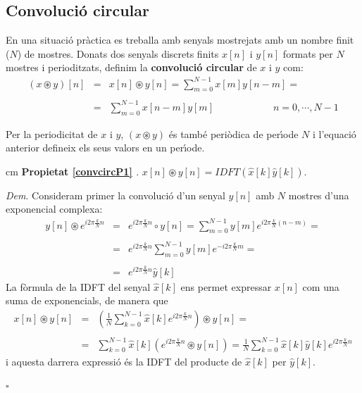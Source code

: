 \documentclass{article}
\begin{document}
\subsection{Convoluci\'o circular}
En una situaci\'o pr\`actica es treballa amb senyals mostrejats amb un nombre finit 
($N$) de mostres. Donats dos senyals discrets finits $x[n]$ i $y[n]$ formats 
per $N$ mostres i perioditzats, definim la {\bf convoluci\'o circular} de $x$ i $y$
com:
\begin{equation}
\begin{array}{rcl}
(x \circledast y)[n] & = & x[n] \circledast y[n]=\sum_{m=0}^{N-1} x[m] y[n-m]=\\\\
 & = & \sum_{m=0}^{N-1} x[n-m]y[m] \qquad \qquad \qquad  n=0, \cdots,N-1
\end{array}
\end{equation}
 
Per la periodicitat de $x$ i $y$, $(x \circledast y)$ \'es tamb\'e peri\`odica de 
per\'\i ode $N$ i l'equaci\'o anterior defineix els seus valors en un per\'\i ode.
 
 cm
\noindent
{\bf Propietat \ref{convcircP1} \label{convcircP1}}. 
$x[n] \circledast y[n] = IDFT ( \hat{x}[k] \hat{y}[k] )$.

\noindent
{\it Dem}. Consideram primer la convoluci\'o d'un senyal $y[n]$ amb 
$N$ mostres d'una exponencial complexa:
\[
\begin{array}{rcl}
y[n] \circledast e^{i 2 \pi \frac{k}{N} n} & = & e^{i 2 \pi \frac{k}{N} n} \circ y[n] =
\sum_{m=0}^{N-1} y[m] e^{i 2 \pi \frac{k}{N} (n-m)} =\\\\
 & = & e^{i 2 \pi \frac{k}{N} n} \sum_{m=0}^{N-1} y[m] e^{-i 2 \pi \frac{k}{N} m}=\\\\
 & = & e^{i 2 \pi \frac{k}{N} n} \hat{y}[k]
\end{array}
\]
\noindent 
La f\`ormula de la IDFT del senyal $\hat{x}[k]$ ens permet expressar $x[n]$ com una
suma de exponencials, de manera que
\[
\begin{array}{rcl}
x[n] \circledast y[n] & = & 
(\frac{1}{N} \sum_{k=0}^{N-1} \hat{x}[k] e^{i 2 \pi \frac{k}{N} n}) \circledast y[n] =\\\\
 & = & \sum_{k=0}^{N-1} \hat{x}[k] (e^{i 2 \pi \frac{k}{N} n} \circledast y[n]) =
 \frac{1}{N} \sum_{k=0}^{N-1} \hat{x}[k] \hat{y}[k] e^{i 2 \pi \frac{k}{N} n} 
\end{array}
\]
\noindent 
i aquesta darrera expressi\'o \'es la IDFT del producte de $\hat{x}[k]$ per $\hat{y}[k]$.
\begin{flushright}
$\square$
\end{flushright}
\end{document}
